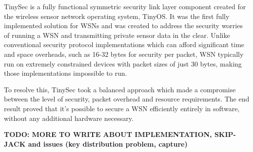 TinySec is a fully functional symmetric security link layer component created for the wireless sensor network operating system, TinyOS. It was the first fully implemented solution for WSNs and was created to address the security worries of running a WSN and transmitting private sensor data in the clear. Unlike conventional security protocol implementations which can afford significant time and space overheads, such as 16-32 bytes for security per packet, WSN typically run on extremely constrained devices with packet sizes of just 30 bytes, making those implementations impossible to run.

To resolve this, TinySec took a balanced approach which made a compromise between the level of security, packet overhead and resource requirements. The end result proved that it's possible to secure a WSN efficiently entirely in software, without any additional hardware necessary.

\textbf{TODO: MORE TO WRITE ABOUT IMPLEMENTATION, SKIP-JACK and issues (key distribution problem, capture)}